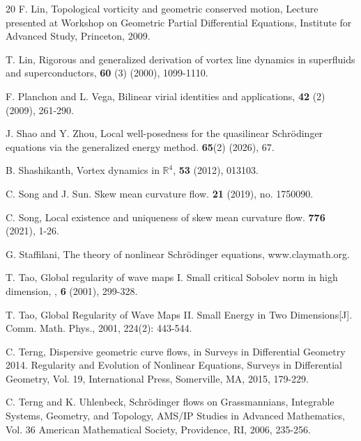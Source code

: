 \documentclass[11pt,letterpaper,reqno]{amsart}
\numberwithin{equation}{section}
\theoremstyle{definition}
\theoremstyle{remark}
\begin{document}
\begin{thebibliography}{20}
	F. Lin, Topological vorticity and geometric conserved motion, Lecture presented at
	Workshop on Geometric Partial Differential Equations, Institute for Advanced Study,
	Princeton, 2009.
	
	
	T. Lin, Rigorous and generalized derivation of vortex line dynamics in superfluids
	and superconductors,  \textbf{60} (3) (2000), 1099-1110.
	
	
	
	F. Planchon and L. Vega, Bilinear virial identities and applications,  \textbf{42} (2) (2009), 261-290.
	
	
	
	J. Shao and Y. Zhou,  Local well-posedness for the quasilinear Schrödinger equations via the generalized energy method.   \textbf{65}(2) (2026), 67.
	
	
	
	B. Shashikanth, Vortex dynamics in $ \mathbb{R}^4 $,  \textbf{53} (2012), 013103.
	
	
	C. Song and J. Sun. Skew mean curvature flow.  \textbf{21} (2019), no. 1750090.
    
C. Song, Local existence and uniqueness of skew mean curvature flow.   \textbf{776} (2021), 1-26. 
	
	
	G. Staffilani, The theory of nonlinear Schr\"odinger equations, www.claymath.org.




	T. Tao, Global regularity of wave maps I. Small critical Sobolev norm in high dimension, , \textbf{6} (2001), 299-328.

     T. Tao, Global Regularity of Wave Maps II. Small Energy in Two Dimensions[J]. Comm. Math. Phys., 2001, 224(2): 443-544.  
	
	C. Terng, Dispersive geometric curve flows, in Surveys in Differential Geometry 2014.
	Regularity and Evolution of Nonlinear Equations, Surveys in Differential Geometry,
	Vol. 19, International Press, Somerville, MA, 2015,  179-229.
	
	
	
	C. Terng and K. Uhlenbeck, Schr\"odinger flows on Grassmannians,  Integrable
	Systems, Geometry, and Topology, AMS/IP Studies in Advanced Mathematics,
	Vol. 36 American Mathematical Society, Providence, RI, 2006,  235-256.
	

\end{thebibliography}
\end{document}
